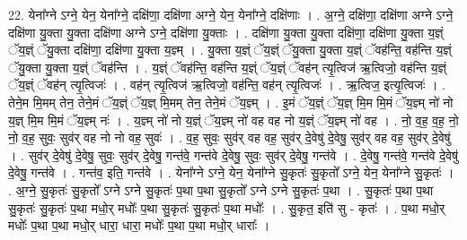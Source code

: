 \documentclass[17pt]{extarticle}
\begin{document}
22. येना᳚ग्ने ऽग्ने॒ येन॒ येना᳚ग्ने॒ दक्षि॑णा॒ दक्षि॑णा अग्ने॒ येन॒ येना᳚ग्ने॒ दक्षि॑णाः । . अ॒ग्ने॒ दक्षि॑णा॒ दक्षि॑णा अग्ने ऽग्ने॒ दक्षि॑णा यु॒क्ता यु॒क्ता दक्षि॑णा अग्ने ऽग्ने॒ दक्षि॑णा यु॒क्ताः । . दक्षि॑णा यु॒क्ता यु॒क्ता दक्षि॑णा॒ दक्षि॑णा यु॒क्ता य॒ज्ञ्ं ॅय॒ज्ञ्ं ॅयु॒क्ता दक्षि॑णा॒ दक्षि॑णा यु॒क्ता य॒ज्ञ्म् । . यु॒क्ता य॒ज्ञ्ं ॅय॒ज्ञ्ं ॅयु॒क्ता यु॒क्ता य॒ज्ञ्ं ॅवह॑न्ति॒ वह॑न्ति य॒ज्ञ्ं ॅयु॒क्ता यु॒क्ता य॒ज्ञ्ं ॅवह॑न्ति । . य॒ज्ञ्ं ॅवह॑न्ति॒ वह॑न्ति य॒ज्ञ्ं ॅय॒ज्ञ्ं ॅवह॑न् त्यृ॒त्विज॑ ऋ॒त्विजो॒ वह॑न्ति य॒ज्ञ्ं ॅय॒ज्ञ्ं ॅवह॑न् त्यृ॒त्विजः॑ । . वह॑न् त्यृ॒त्विज॑ ऋ॒त्विजो॒ वह॑न्ति॒ वह॑न् त्यृ॒त्विजः॑ । . ऋ॒त्विज॒ इत्यृ॒त्विजः॑ । . तेने॒म मि॒मम् तेन॒ तेने॒मं ॅय॒ज्ञ्ं ॅय॒ज्ञ् मि॒मम् तेन॒ तेने॒मं ॅय॒ज्ञ्म् । . इ॒मं ॅय॒ज्ञ्ं ॅय॒ज्ञ् मि॒म मि॒मं ॅय॒ज्ञ्म् नो॑ नो य॒ज्ञ् मि॒म मि॒मं ॅय॒ज्ञ्म् नः॑ । . य॒ज्ञ्म् नो॑ नो य॒ज्ञ्ं ॅय॒ज्ञ्म् नो॑ वह वह नो य॒ज्ञ्ं ॅय॒ज्ञ्म् नो॑ वह । . नो॒ व॒ह॒ व॒ह॒ नो॒ नो॒ व॒ह॒ सुवः॒ सुव॑र् वह नो नो वह॒ सुवः॑ । . व॒ह॒ सुवः॒ सुव॑र् वह वह॒ सुव॑र् दे॒वेषु॑ दे॒वेषु॒ सुव॑र् वह वह॒ सुव॑र् दे॒वेषु॑ । . सुव॑र् दे॒वेषु॑ दे॒वेषु॒ सुवः॒ सुव॑र् दे॒वेषु॒ गन्त॑वे॒ गन्त॑वे दे॒वेषु॒ सुवः॒ सुव॑र् दे॒वेषु॒ गन्त॑वे । . दे॒वेषु॒ गन्त॑वे॒ गन्त॑वे दे॒वेषु॑ दे॒वेषु॒ गन्त॑वे । . गन्त॑व॒ इति॒ गन्त॑वे । . येना᳚ग्ने ऽग्ने॒ येन॒ येना᳚ग्ने सु॒कृतः॑ सु॒कृतो᳚ ऽग्ने॒ येन॒ येना᳚ग्ने सु॒कृतः॑ । . अ॒ग्ने॒ सु॒कृतः॑ सु॒कृतो᳚ ऽग्ने ऽग्ने सु॒कृतः॑ प॒था प॒था सु॒कृतो᳚ ऽग्ने ऽग्ने सु॒कृतः॑ प॒था । . सु॒कृतः॑ प॒था प॒था सु॒कृतः॑ सु॒कृतः॑ प॒था मधो॒र् मधोः᳚ प॒था सु॒कृतः॑ सु॒कृतः॑ प॒था मधोः᳚ । . सु॒कृत॒ इति॑ सु - कृतः॑ । . प॒था मधो॒र् मधोः᳚ प॒था प॒था मधो॒र् धारा॒ धारा॒ मधोः᳚ प॒था प॒था मधो॒र् धाराः᳚ । \newline
\end{document}
